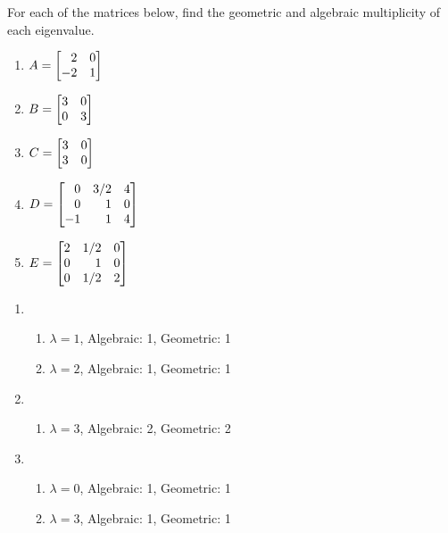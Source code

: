 
\begin{exercises}

	\begin{problist}
		\prob For each of the matrices below, find the geometric and algebraic
		multiplicity of each eigenvalue. \label{PROBMOD16-matrices}
		\begin{enumerate}
			\item $A=\mat{2&0\\-2&1}$

			\item $B=\mat{3&0\\0&3}$

			\item $C=\mat{3&0\\3&0}$

			\item $D=\mat{0&3/2&4\\0&1&0\\-1&1&4}$

			\item $E=\mat{2&1/2&0\\0&1&0\\0&1/2&2}$
		\end{enumerate}%

		\begin{solution}

			\begin{enumerate}


				\item
					\begin{enumerate}
						\item $\lambda=1$, Algebraic: 1,
							Geometric: 1

						\item $\lambda=2$, Algebraic: 1,
							Geometric: 1
					\end{enumerate}%


				\item
					\begin{enumerate}
						\item $\lambda=3$, Algebraic: 2,
							Geometric: 2
					\end{enumerate}%


				\item
					\begin{enumerate}
						\item $\lambda=0$, Algebraic: 1,
							Geometric: 1

						\item $\lambda=3$, Algebraic: 1,
							Geometric: 1
					\end{enumerate}%



\end{enumerate}
\end{solution}
\end{problist}
\end{exercises}
